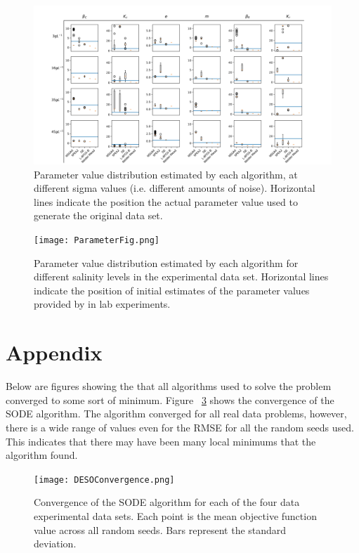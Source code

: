 \documentclass[twocolumn, 9pt]{article}
\begin{document}
\begin{figure}[ht]
    \centering
    \includegraphics[width=\textwidth]{sigmaParameterFig.png}
    \caption{Parameter value distribution estimated by each algorithm, at different sigma values (i.e. different amounts of noise). Horizontal lines indicate the position the actual parameter value used to generate the original data set.}
    \label{fig:SigmaParameterSols}
\end{figure}

\begin{figure}[ht]
    \centering
    \texttt{[image: ParameterFig.png]}
    \caption{Parameter value distribution estimated by each algorithm for different salinity levels in the experimental data set. Horizontal lines indicate the position of initial estimates of the parameter values provided by in lab experiments.}
    \label{fig:ParameterSols}
\end{figure}

\newpage
\section*{Appendix}
\indent{} Below are figures showing the that all algorithms used to solve the problem converged to some sort of minimum. Figure ~\ref{fig:DESOConvergence} shows the convergence of the SODE algorithm. The algorithm converged for all real data problems, however, there is a wide range of values even for the RMSE for all the random seeds used. This indicates that there may have been many local minimums that the algorithm found.
\begin{figure}[ht]
    \centering
    \texttt{[image: DESOConvergence.png]}
    \caption{Convergence of the SODE algorithm for each of the four data experimental data sets. Each point is the mean objective function value across all random seeds. Bars represent the standard deviation.}
    \label{fig:DESOConvergence}
\end{figure}
\end{document}
